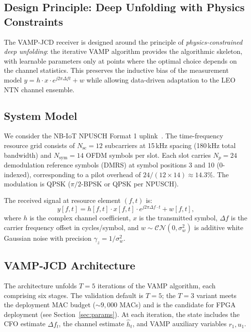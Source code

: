 \documentclass{article}
\begin{document}
\subsection{Design Principle: Deep Unfolding with Physics Constraints}

The VAMP-JCD receiver is designed around the principle of \emph{physics-constrained deep unfolding}: the iterative VAMP algorithm provides the algorithmic skeleton, with learnable parameters only at points where the optimal choice depends on the channel statistics. This preserves the inductive bias of the measurement model $y = h \cdot x \cdot e^{j2\pi\Delta f t} + w$ while allowing data-driven adaptation to the LEO NTN channel ensemble.

\subsection{System Model}

We consider the NB-IoT NPUSCH Format 1 uplink~\cite{3gppTR36763}. The time-frequency resource grid consists of $N_{\mathrm{sc}} = 12$ subcarriers at 15\,kHz spacing (180\,kHz total bandwidth) and $N_{\mathrm{sym}} = 14$ OFDM symbols per slot. Each slot carries $N_p = 24$ demodulation reference symbols (DMRS) at symbol positions 3 and 10 (0-indexed), corresponding to a pilot overhead of $24/(12 \times 14) \approx 14.3\%$. The modulation is QPSK ($\pi/2$-BPSK or QPSK per NPUSCH).

The received signal at resource element $(f, t)$ is:
\begin{equation}
y[f, t] = h[f, t] \cdot x[f, t] \cdot e^{j2\pi \Delta f \cdot t} + w[f, t],
\end{equation}
where $h$ is the complex channel coefficient, $x$ is the transmitted symbol, $\Delta f$ is the carrier frequency offset in cycles/symbol, and $w \sim \mathcal{CN}(0, \sigma_w^2)$ is additive white Gaussian noise with precision $\gamma_z = 1/\sigma_w^2$.

\subsection{VAMP-JCD Architecture}

The architecture unfolds $T = 5$ iterations of the VAMP algorithm, each comprising six stages. The validation default is $T=5$; the $T=3$ variant meets the deployment MAC budget ($\sim 9{,}000$ MACs) and is the candidate for FPGA deployment (see Section~\ref{sec:params}). At each iteration, the state includes the CFO estimate $\Delta f_t$, the channel estimate $\hat{h}_t$, and VAMP auxiliary variables $r_1, u_1$.
\end{document}

